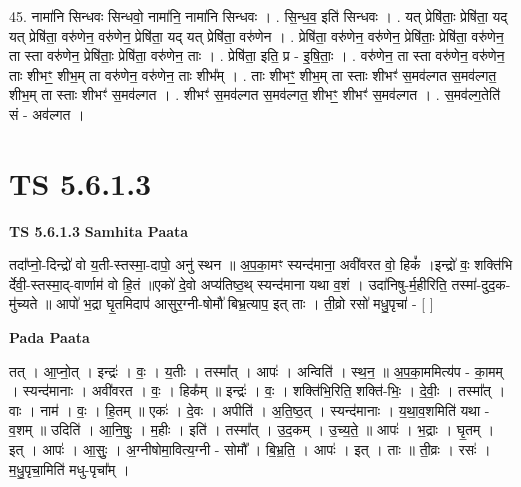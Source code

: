 \documentclass[17pt]{extarticle}
\begin{document}
45. नामा॑नि सिन्धवः सिन्धवो॒ नामा॑नि॒ नामा॑नि सिन्धवः । . सि॒न्ध॒व॒ इति॑ सिन्धवः । . यत् प्रेषि॑ताः॒ प्रेषि॑ता॒ यद् यत् प्रेषि॑ता॒ वरु॑णेन॒ वरु॑णेन॒ प्रेषि॑ता॒ यद् यत् प्रेषि॑ता॒ वरु॑णेन । . प्रेषि॑ता॒ वरु॑णेन॒ वरु॑णेन॒ प्रेषि॑ताः॒ प्रेषि॑ता॒ वरु॑णेन॒ ता स्ता वरु॑णेन॒ प्रेषि॑ताः॒ प्रेषि॑ता॒ वरु॑णेन॒ ताः । . प्रेषि॑ता॒ इति॒ प्र - इ॒षि॒ताः॒ । . वरु॑णेन॒ ता स्ता वरु॑णेन॒ वरु॑णेन॒ ताः शीभꣳ॒॒ शीभ॒म् ता वरु॑णेन॒ वरु॑णेन॒ ताः शीभ᳚म् । . ताः शीभꣳ॒॒ शीभ॒म् ता स्ताः शीभꣳ॑ स॒मव॑ल्गत स॒मव॑ल्गत॒ शीभ॒म् ता स्ताः शीभꣳ॑ स॒मव॑ल्गत । . शीभꣳ॑ स॒मव॑ल्गत स॒मव॑ल्गत॒ शीभꣳ॒॒ शीभꣳ॑ स॒मव॑ल्गत । . स॒मव॑ल्ग॒तेति॑ सं - अव॑ल्गत । \newline
\pagebreak
{}

\section{ TS 5.6.1.3 }

\textbf{TS 5.6.1.3 } \newline
\textbf{Samhita Paata} \newline

तदा᳚प्नो॒-दिन्द्रो॑ वो य॒ती-स्तस्मा॒-दापो॒ अनु॑ स्थन ॥ अ॒प॒का॒मꣳ स्यन्द॑माना॒ अवी॑वरत वो॒ हिकं᳚ ।इन्द्रो॑ वः॒ शक्ति॑भि र्देवी॒-स्तस्मा॒द्-वार्णाम॑ वो हि॒तं ॥एको॑ दे॒वो अप्य॑तिष्ठ॒थ् स्यन्द॑माना यथा व॒शं । उदा॑निषु-र्म॒हीरिति॒ तस्मा॑-दुद॒क-मु॑च्यते ॥ आपो॑ भ॒द्रा घृ॒तमिदाप॑ आसुर॒ग्नी-षोमौ॑ बिभ्र॒त्याप॒ इत् ताः । ती॒व्रो रसो॑ मधु॒पृचा॑ - [  ] \newline

\textbf{Pada Paata} \newline

तत् । आ॒प्नो॒त् । इन्द्रः॑ । वः॒ । य॒तीः । तस्मा᳚त् । आपः॑ । अन्विति॑ । स्थ॒न॒ ॥ अ॒प॒का॒ममित्य॑प - का॒मम् । स्यन्द॑मानाः । अवी॑वरत । वः॒ । हिक᳚म् ॥ इन्द्रः॑ । वः॒ । शक्ति॑भि॒रिति॒ शक्ति॑-भिः॒ । दे॒वीः॒ । तस्मा᳚त् । वाः । नाम॑ । वः॒ । हि॒तम् ॥ एकः॑ । दे॒वः । अपीति॑ । अ॒ति॒ष्ठ॒त् । स्यन्द॑मानाः । य॒था॒व॒शमिति॑ यथा - व॒शम् ॥ उदिति॑ । आ॒नि॒षुः॒ । म॒हीः । इति॑ । तस्मा᳚त् । उ॒द॒कम् । उ॒च्य॒ते॒ ॥ आपः॑ । भ॒द्राः । घृ॒तम् । इत् । आपः॑ । आ॒सुः॒ । अ॒ग्नीषोमा॒वित्य॒ग्नी - सोमौ᳚ । बि॒भ्र॒ति॒ । आपः॑ । इत् । ताः ॥ ती॒व्रः । रसः॑ । म॒धु॒पृचा॒मिति॑ मधु-पृचा᳚म् ।  \newline
\end{document}
